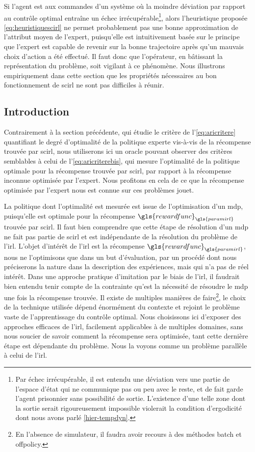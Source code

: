 \documentclass[frenchb,a4paper,justified,notoc]{tufte-book}
\newcommand{\rewardfunc}{\gls{rewardfunc}}
\newcommand{\paramirl}{\gls{paramirl}}
\begin{document}
   Si l'agent est aux commandes d'un système où la moindre déviation par rapport au contrôle optimal entraîne un échec irrécupérable\footnote{Par échec irrécupérable, il est entendu une déviation vers une partie de l'espace d'état qui ne communique pas ou peu avec le reste, et de fait garde l'agent prisonnier sans possibilité de sortie. L'existence d'une telle zone dont la sortie serait rigoureusement impossible violerait la condition d'ergodicité dont nous avons parlé \autoref{hier-tempdyn}.
 }, alors l'heuristique proposée \autoref{eq:heuristiquescirl} ne permet probablement pas une bonne approximation de l'attribut moyen de l'expert, puisqu'elle est intuitivement basée sur le principe que l'expert est capable de revenir sur la bonne trajectoire après qu'un mauvais choix d'action a été effectué. Il faut donc que l'opérateur, en bâtissant la représentation du problème, soit vigilant à ce phénomène. Nous illustrons empiriquement dans cette section que les propriétés nécessaires au bon fonctionnement de \gls{scirl} ne sont pas difficiles à réunir.
\subsection{Introduction}
\label{sec-5-4-1}


   Contrairement à la section précédente, qui étudie le critère de l'\autoref{eq:aricritere} quantifiant le degré d'optimalité de la politique experte vis-à-vis de la récompense trouvée par \gls{scirl}, nous utiliserons ici un oracle pouvant observer des critères semblables à celui de l'\autoref{eq:aricriterebis}, qui mesure l'optimalité de la politique optimale pour la récompense trouvée par \gls{scirl}, par rapport à la récompense inconnue optimisée par l'expert. Nous profitons en cela de ce que la récompense optimisée par l'expert nous est connue sur ces problèmes jouet.

   La politique dont l'optimalité est mesurée est issue de l'optimisation d'un \gls{mdp}, puisqu'elle est optimale pour la récompense $\rewardfunc_{\paramirl}$ trouvée par \gls{scirl}. Il faut bien comprendre que cette étape de résolution d'un \gls{mdp} ne fait pas partie de \gls{scirl} et est indépendante de la résolution du problème de l'\gls{irl}. L'objet d'intérêt de l'\gls{irl} est la récompense $\rewardfunc_{\paramirl}$, nous ne l'optimisons que dans un but d'évaluation, par un procédé dont nous préciserons la nature dans la description des expériences, mais qui n'a pas de réel intérêt. Dans une approche pratique d'imitation par le biais de l'\gls{irl}, il faudrait bien entendu tenir compte de la contrainte qu'est la nécessité de résoudre le \gls{mdp} une fois la récompense trouvée. Il existe de multiples manières de faire\footnote{En l'absence de simulateur, il faudra avoir recours à des méthodes \gls{batch} et \gls{offpolicy}.
 }, le choix de la technique utilisée dépend énormément du contexte et rejoint le problème vaste de l'apprentissage du contrôle optimal. Nous choisissons ici d'exposer des approches efficaces de l'\gls{irl}, facilement applicables à de multiples domaines, sans nous soucier de savoir comment la récompense sera optimisée, tant cette dernière étape est dépendante du problème. Nous la voyons comme un problème parallèle à celui de l'\gls{irl}.
\end{document}
